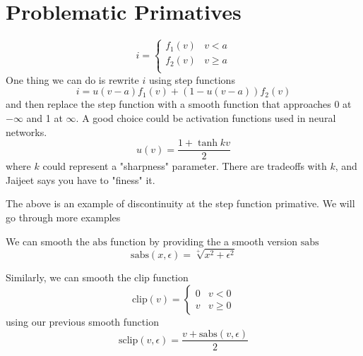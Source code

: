 \documentclass{report}
\begin{document}
\section{Problematic Primatives}

\begin{example}
    \begin{equation*}
        i = 
        \begin{cases}
            f_1(v) & v < a \\
            f_2(v) & v \geq a \\
        \end{cases}
    \end{equation*}
    One thing we can do is rewrite $i$ using step functions
    \begin{equation*}
        i = u(v - a) f_1(v) + (1 - u(v -a)) f_2(v)
    \end{equation*}
    and then replace the step function with a smooth function that approaches 0 at $-\infty$ and 1 at $\infty$. A good choice could be activation functions used in neural networks.
    \begin{equation*}
        u(v) = \frac{1 + \tanh k v}{2}
    \end{equation*}
    where $k$ could represent a "sharpness" parameter. There are tradeoffs with $k$, and Jaijeet says you have to "finess" it.
\end{example}

The above is an example of discontinuity at the step function primative. We will go through more examples

\begin{example}
    We can smooth the $\mathrm{abs}$ function by providing the a smooth version $\mathrm{sabs}$
    \begin{equation*}
        \mathrm{sabs}(x, \epsilon) = \sqrt[+]{x^2 + \epsilon^2}
    \end{equation*}
\end{example}

\begin{example}
    Similarly, we can smooth the clip function
    \begin{equation*}
        \mathrm{clip}(v) = \begin{cases}
            0 & v < 0 \\
            v & v \geq 0
        \end{cases}
    \end{equation*}
    using our previous smooth function
    \begin{equation*}
        \mathrm{sclip}(v, \epsilon) =
            \frac{v + \mathrm{sabs}(v, \epsilon)}{2}
    \end{equation*}
\end{example}
\end{document}
